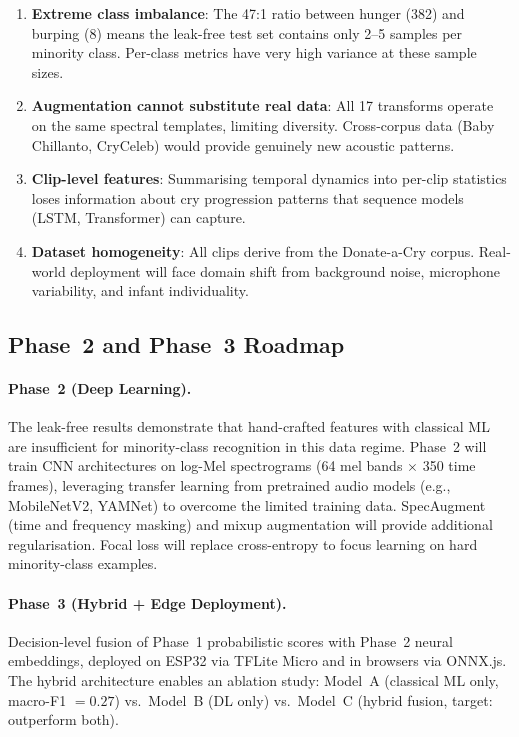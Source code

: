 \documentclass[11pt,a4paper]{article}
\begin{document}
\begin{enumerate}[nosep]
  \item \textbf{Extreme class imbalance}: The 47:1 ratio between
        hunger (382) and burping (8) means the leak-free test set
        contains only 2--5 samples per minority class. Per-class
        metrics have very high variance at these sample sizes.
  \item \textbf{Augmentation cannot substitute real data}: All 17
        transforms operate on the same spectral templates, limiting
        diversity. Cross-corpus data (Baby Chillanto, CryCeleb) would
        provide genuinely new acoustic patterns.
  \item \textbf{Clip-level features}: Summarising temporal dynamics
        into per-clip statistics loses information about cry
        progression patterns that sequence models (LSTM, Transformer)
        can capture.
  \item \textbf{Dataset homogeneity}: All clips derive from the
        Donate-a-Cry corpus. Real-world deployment will face domain
        shift from background noise, microphone variability, and
        infant individuality.
\end{enumerate}

\subsection{Phase~2 and Phase~3 Roadmap}

\paragraph{Phase~2 (Deep Learning).}
The leak-free results demonstrate that hand-crafted features with
classical ML are insufficient for minority-class recognition in this
data regime. Phase~2 will train CNN architectures on log-Mel
spectrograms (64 mel bands $\times$ 350 time frames), leveraging
transfer learning from pretrained audio models (e.g., MobileNetV2,
YAMNet) to overcome the limited training data. SpecAugment (time and
frequency masking) and mixup augmentation will provide additional
regularisation. Focal loss will replace cross-entropy to focus
learning on hard minority-class examples.

\paragraph{Phase~3 (Hybrid + Edge Deployment).}
Decision-level fusion of Phase~1 probabilistic scores with Phase~2
neural embeddings, deployed on ESP32 via TFLite Micro and in browsers
via ONNX.js. The hybrid architecture enables an ablation study:
Model~A (classical ML only, macro-F1 $= 0.27$) vs.\ Model~B (DL only)
vs.\ Model~C (hybrid fusion, target: outperform both).
\end{document}
